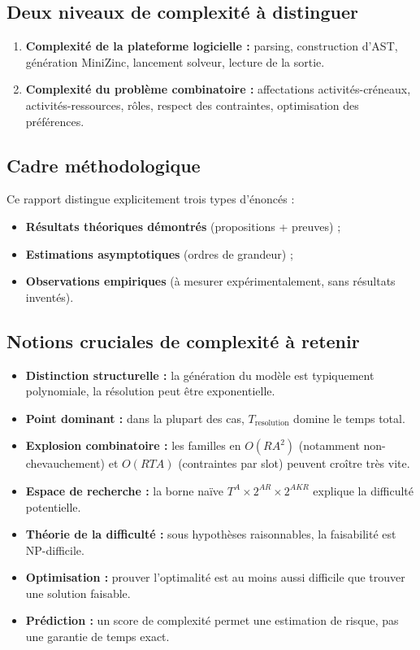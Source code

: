 \documentclass[12pt,a4paper]{article}
\begin{document}
\subsection{Deux niveaux de complexité à distinguer}
\begin{enumerate}[label=\arabic*.]
  \item \textbf{Complexité de la plateforme logicielle :} parsing, construction d'AST, génération MiniZinc, lancement solveur, lecture de la sortie.
  \item \textbf{Complexité du problème combinatoire :} affectations activités-créneaux, activités-ressources, rôles, respect des contraintes, optimisation des préférences.
\end{enumerate}

\subsection{Cadre méthodologique}
Ce rapport distingue explicitement trois types d'énoncés :
\begin{itemize}
  \item \textbf{Résultats théoriques démontrés} (propositions + preuves) ;
  \item \textbf{Estimations asymptotiques} (ordres de grandeur) ;
  \item \textbf{Observations empiriques} (à mesurer expérimentalement, sans résultats inventés).
\end{itemize}

\subsection{Notions cruciales de complexité à retenir}
\begin{itemize}
  \item \textbf{Distinction structurelle :} la génération du modèle est typiquement polynomiale, la résolution peut être exponentielle.
  \item \textbf{Point dominant :} dans la plupart des cas, $T_{\text{resolution}}$ domine le temps total.
  \item \textbf{Explosion combinatoire :} les familles en $O(RA^2)$ (notamment non-chevauchement) et $O(RTA)$ (contraintes par slot) peuvent croître très vite.
  \item \textbf{Espace de recherche :} la borne naïve $T^A \times 2^{AR} \times 2^{AKR}$ explique la difficulté potentielle.
  \item \textbf{Théorie de la difficulté :} sous hypothèses raisonnables, la faisabilité est NP-difficile.
  \item \textbf{Optimisation :} prouver l'optimalité est au moins aussi difficile que trouver une solution faisable.
  \item \textbf{Prédiction :} un score de complexité permet une estimation de risque, pas une garantie de temps exact.
\end{itemize}
\end{document}
